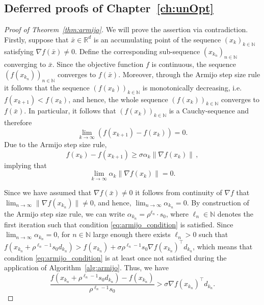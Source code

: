 \documentclass[12pt,openany]{book}
\theoremstyle{definition}
\theoremstyle{definition}
\newcommand{\N}{\mathbb{N}}
\newcommand{\R}{\mathbb{R}}
\begin{document}
\subsection{Deferred proofs of Chapter~\ref{ch:unOpt}}
\begin{proof}[Proof of Theorem~\ref{thm:armijo}]
We will prove the assertion via contradiction. Firstly, suppose that $\bar x\in\R^d$ is an accumulating point of the sequence $(x_k)_{k\in\N}$ satisfying $\nabla f(\bar x) \neq 0$. Define the corresponding sub-sequence $(x_{k_n})_{n\in\N}$ converging to $\bar x$. Since the objective function $f$ is continuous, the sequence $(f(x_{k_n}))_{n\in\N}$ converges to $f(\bar x)$. Moreover, through the Armijo step size rule it follows that the sequence $(f(x_k))_{k\in\N}$ is monotonically decreasing, i.e.~$f(x_{k+1}) < f(x_k)$, and hence, the whole sequence $(f(x_k))_{k\in\N}$ converges to $f(\bar x)$. In particular, it follows that $(f(x_k))_{k\in\N}$ is a Cauchy-sequence and therefore
\[\lim_{k\to\infty} (f(x_{k+1})-f(x_k)) = 0. \]
Due to the Armijo step size rule,
\[f(x_k) - f(x_{k+1}) \ge \sigma \alpha_k \|\nabla f(x_k)\|\,, \]
implying that 
\[\lim_{k\to\infty} \alpha_k \|\nabla f(x_k)\| = 0. \]

Since we have assumed that $\nabla f(\bar x) \neq 0$ it follows from continuity of $\nabla f$ that $\lim_{n\to\infty}\|\nabla f(x_{k_n})\|\neq 0$, and hence, $\lim_{n\to\infty} \alpha_{k_n} = 0$. By construction of the Armijo step size rule, we can write $\alpha_{k_n} = \rho^{\ell_n}\cdot s_0$, where $\ell_n\in\N$ denotes the first iteration such that condition \eqref{eq:armijo_condition} is satisfied. Since $\lim_{n\to\infty} \alpha_{k_n} = 0$, for $n\in\N$ large enough there exists $\ell_n>0$ such that $f(x_{k_n}+\rho^{\ell_n-1} s_0d_{k_n}) > f(x_{k_n}) + \sigma\rho^{\ell_n-1}s_0 \nabla f(x_{k_n})^\top d_{k_n}$, which means that condition \eqref{eq:armijo_condition} is at least once not satisfied during the application of Algorithm~\ref{alg:armijo}. Thus, we have
\begin{equation} \label{eq:armijo_cond_n}
\frac{f(x_{k_n}+\rho^{\ell_n-1} s_0 d_{k_n})-f(x_{k_n})}{\rho^{\ell_n-1} s_0}> \sigma \nabla f(x_{k_n})^\top d_{k_n}. 
\end{equation}


\end{proof}
\end{document}

